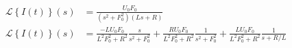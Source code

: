 \documentclass{article}
\newcommand{\Laplace}[1]{\mathcal{L}\left\{#1\right\}(s)}
\begin{document}
\begin{align*}
    \Laplace{I(t)}  & = \frac{U_0 F_0}{(s^2 + F_0^2)(Ls+R)} \\
    \Laplace{I(t)}  & = \frac{-L U_0 F_0}{L^2 F_0^2 + R^2}\frac{s}{s^2 + F_0^2} +  \frac{R U_0 F_0}{L^2 F_0^2 + R^2}\frac{1}{s^2 + F_0^2} + \frac{L U_0 F_0}{L^2 F_0^2 + R^2}\frac{1}{s + R/L}  \\
\end{align*}
\end{document}
